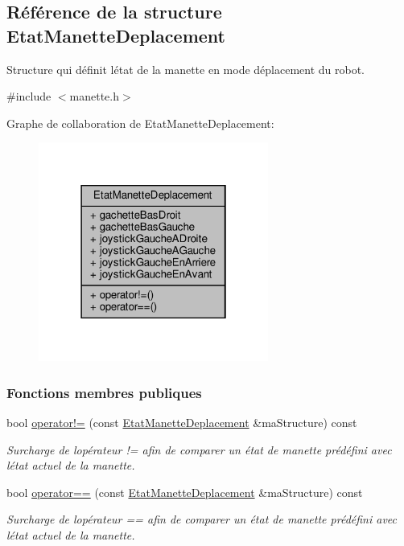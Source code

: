 \hypertarget{struct_etat_manette_deplacement}{}\subsection{Référence de la structure Etat\+Manette\+Deplacement}
\label{struct_etat_manette_deplacement}


Structure qui définit l\textquotesingle{}état de la manette en mode déplacement du robot.  




{\ttfamily \#include $<$manette.\+h$>$}



Graphe de collaboration de Etat\+Manette\+Deplacement\+:\nopagebreak
\begin{figure}[H]
\begin{center}
\leavevmode
\includegraphics[width=214pt]{struct_etat_manette_deplacement__coll__graph}
\end{center}
\end{figure}
\subsubsection*{Fonctions membres publiques}
\begin{DoxyCompactItemize}
\item 
bool \hyperlink{struct_etat_manette_deplacement_aa57df0ecb60478f389d84c6e5d0cc1b8}{operator!=} (const \hyperlink{struct_etat_manette_deplacement}{Etat\+Manette\+Deplacement} \&ma\+Structure) const
\begin{DoxyCompactList}\small\item\em Surcharge de l\textquotesingle{}opérateur != afin de comparer un état de manette prédéfini avec l\textquotesingle{}état actuel de la manette. \end{DoxyCompactList}\item 
bool \hyperlink{struct_etat_manette_deplacement_a8f248b6ec1788c058e161b74fb371c5b}{operator==} (const \hyperlink{struct_etat_manette_deplacement}{Etat\+Manette\+Deplacement} \&ma\+Structure) const
\begin{DoxyCompactList}\small\item\em Surcharge de l\textquotesingle{}opérateur == afin de comparer un état de manette prédéfini avec l\textquotesingle{}état actuel de la manette. \end{DoxyCompactList}\end{DoxyCompactItemize}
